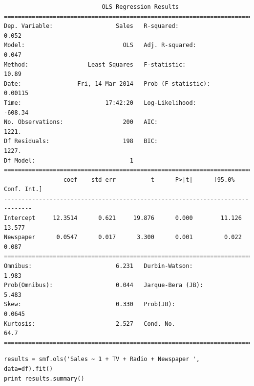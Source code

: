 \documentclass[12pt,fleqn]{article}\usepackage{../common}
\begin{document}
\begin{verbatim}
                            OLS Regression Results                            
==============================================================================
Dep. Variable:                  Sales   R-squared:                       0.052
Model:                            OLS   Adj. R-squared:                  0.047
Method:                 Least Squares   F-statistic:                     10.89
Date:                Fri, 14 Mar 2014   Prob (F-statistic):            0.00115
Time:                        17:42:20   Log-Likelihood:                -608.34
No. Observations:                 200   AIC:                             1221.
Df Residuals:                     198   BIC:                             1227.
Df Model:                           1                                         
==============================================================================
                 coef    std err          t      P>|t|      [95.0% Conf. Int.]
------------------------------------------------------------------------------
Intercept     12.3514      0.621     19.876      0.000        11.126    13.577
Newspaper      0.0547      0.017      3.300      0.001         0.022     0.087
==============================================================================
Omnibus:                        6.231   Durbin-Watson:                   1.983
Prob(Omnibus):                  0.044   Jarque-Bera (JB):                5.483
Skew:                           0.330   Prob(JB):                       0.0645
Kurtosis:                       2.527   Cond. No.                         64.7
==============================================================================
\end{verbatim}

\begin{verbatim}
results = smf.ols('Sales ~ 1 + TV + Radio + Newspaper ', data=df).fit()
print results.summary()
\end{verbatim}
\end{document}
